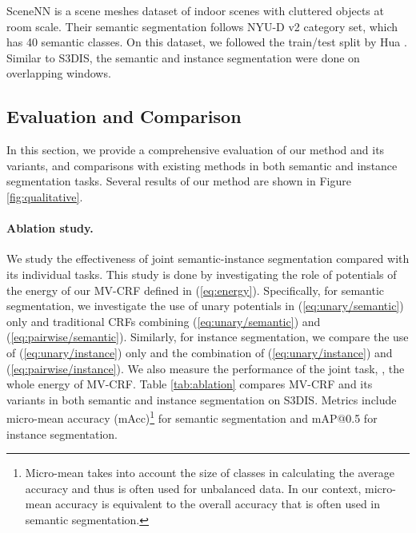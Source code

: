 \documentclass[10pt,twocolumn,letterpaper]{article}
\begin{document}
SceneNN \cite{hua-scenenn-3dv16} is a scene meshes dataset of indoor scenes with
cluttered objects at room scale. Their semantic segmentation follows NYU-D v2
\cite{silberman-nyud-eccv12} category set, which has 40 semantic classes. On
this dataset, we followed the train/test split by Hua \etal
\cite{hua-pointwise-cvpr18}. Similar to S3DIS, the semantic and instance
segmentation were done on overlapping windows.

\subsection{Evaluation and Comparison}
In this section, we provide a comprehensive evaluation of our method and its
variants, and comparisons with existing methods in both semantic and instance
segmentation tasks. Several results of our method are shown in Figure
\ref{fig:qualitative}.

\paragraph{Ablation study.}

We study the effectiveness of joint semantic-instance segmentation compared with
its individual tasks. This study is done by investigating the role of potentials
of the energy of our MV-CRF defined in (\ref{eq:energy}). Specifically, for
semantic segmentation, we investigate the use of unary potentials in
(\ref{eq:unary/semantic}) only and traditional CRFs combining
(\ref{eq:unary/semantic}) and (\ref{eq:pairwise/semantic}). Similarly, for
instance segmentation, we compare the use of (\ref{eq:unary/instance}) only and
the combination of (\ref{eq:unary/instance}) and (\ref{eq:pairwise/instance}).
We also measure the performance of the joint task, \ie, the whole energy of
MV-CRF. Table \ref{tab:ablation} compares MV-CRF and its variants in both
semantic and instance segmentation on S3DIS. Metrics include micro-mean accuracy
(mAcc)\footnote{Micro-mean takes into account the size of classes in calculating
  the average accuracy and thus is often used for unbalanced data. In our
  context, micro-mean accuracy is equivalent to the overall accuracy that is
  often used in semantic segmentation.} \cite{sokolova-classification-ipm09} for
semantic segmentation and mAP@0.5 for instance segmentation.
\end{document}
